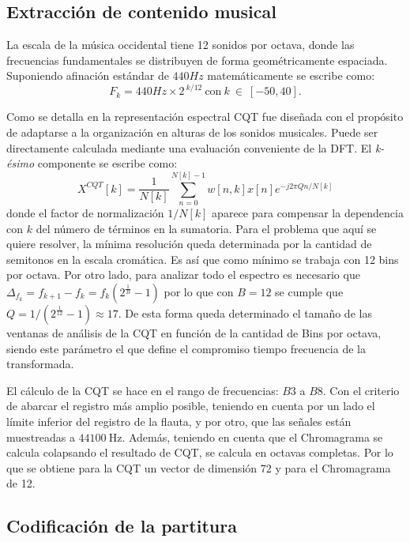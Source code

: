 \documentclass
  [ams,pdfout]%
	{aeslac}
\begin{document}
\subsection{Extracción de contenido musical}

La escala de la música occidental tiene 12 sonidos por octava, donde las frecuencias fundamentales se distribuyen de forma geométricamente espaciada. Suponiendo afinación estándar de $440Hz$ matemáticamente se escribe como:
\begin{equation}
\label{eq:escalaTI}
F_k= 440Hz \times 2^{\:k/12} \: \text{con} \: k \: \in \: [-50,40].
\end{equation}

Como se detalla en \cite{brown1991calculation} la representación espectral CQT fue diseñada con el propósito de adaptarse a la organización en alturas de los sonidos musicales. Puede ser directamente calculada mediante una evaluación conveniente de la DFT. El \textit{k-ésimo} componente se escribe como: 
\begin{equation}
\label{eq:CQT}
X^{CQT}[k]=\frac{1}{N[k]}\sum_{n=0}^{N[k]-1}w[n,k]x[n]e^{-j2\pi Qn/N[k]}
\end{equation}
donde el factor de normalización $1/N[k]$ aparece para compensar la dependencia con $k$ del número de términos en la sumatoria. Para el problema que aquí se quiere resolver, la mínima resolución queda determinada por la cantidad de semitonos en la escala cromática. Es así que como mínimo se trabaja con 12 bins por octava. Por otro lado, para analizar todo el espectro es necesario que $\Delta_{f_k}=f_{k+1}-f_{k}=f_k(2^{\frac{1}{B}}-1)$ por lo que con $B=12$ se cumple que $Q=1/(2^{\frac{1}{12}}-1)\approx 17$. De esta forma queda determinado el tamaño de las ventanas de análisis de la CQT en función de la cantidad de Bins por octava, siendo este parámetro el que define el compromiso tiempo frecuencia de la transformada. 
 
El cálculo de la CQT se hace en el rango de frecuencias: $B3$ a $B8$. Con el criterio de abarcar el registro más amplio posible, teniendo en cuenta por un lado el límite inferior del registro de la flauta, y por otro, que las señales están muestreadas a $44100~\textrm{Hz}$. Además, teniendo en cuenta que el Chromagrama se calcula colapsando el resultado de CQT, se calcula en octavas completas. Por lo que se obtiene para la CQT un vector de dimensión 72 y para el Chromagrama de 12.

\subsection{Codificación de la partitura}
\end{document}
